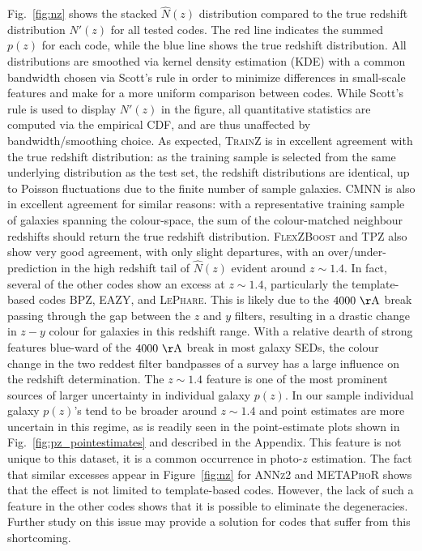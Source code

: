Fig.~\ref{fig:nz} shows the stacked $\hat{N}(z)$ distribution compared to the true redshift distribution $N'(z)$ for all tested codes.  The red line indicates the summed $p(z)$ for each code, while the blue line shows the true redshift distribution. All distributions are smoothed via kernel density estimation (KDE) with a common bandwidth chosen via Scott's rule \citep{Scott:1992} in order to minimize differences in small-scale features and make for a more uniform comparison between codes.  While Scott's rule is used to display $N'(z)$ in the figure, all quantitative statistics are computed via the empirical CDF, and are thus unaffected by bandwidth/smoothing choice.
As expected, \textsc{TrainZ} is in excellent agreement with the true redshift distribution: as the training sample is selected from the same underlying distribution as the test set, the redshift distributions are identical, up to Poisson fluctuations due to the finite number of sample galaxies.  \textsc{CMNN} is also in excellent agreement for similar reasons: with a representative training sample of galaxies spanning the colour-space, the sum of the colour-matched neighbour redshifts should return the true redshift distribution. \textsc{FlexZBoost} and \textsc{TPZ} also show very good agreement, with only slight departures, with an over/under-prediction in the high redshift tail of $\hat{N}(z)$ evident around $z\sim1.4$.  In fact, several of the other codes show an excess at $z \sim 1.4$, particularly the template-based codes \textsc{BPZ}, \textsc{EAZY}, and \textsc{LePhare}.  This is likely due to the $4000\ {\rm \AA}$ break passing through the gap between the $z$ and $y$ filters, resulting in a drastic change in $z-y$ colour for galaxies in this redshift range.  With a relative dearth of strong features blue-ward of the $4000\ {\rm \AA}$ break in most galaxy SEDs, the colour change in the two reddest filter bandpasses of a survey has a large influence on the redshift determination.  The $z\sim1.4$ feature is one of the most prominent sources of larger uncertainty in individual galaxy $p(z)$.
In our sample individual galaxy $p(z)$'s tend to be broader around $z\sim1.4$ and point estimates are more uncertain in this regime, as is readily seen in the point-estimate plots shown in Fig.~\ref{fig:pz_pointestimates} and described in the Appendix.  This feature is not unique to this dataset, it is a common occurrence in photo-$z$ estimation.  The fact that similar excesses appear in Figure~\ref{fig:nz} for \textsc{ANNz2} and \textsc{METAPhoR} shows that the effect is not limited to template-based codes.  However, the lack of such a feature in the other codes shows that it is possible to eliminate the degeneracies.  Further study on this issue may provide a solution for codes that suffer from this shortcoming.

